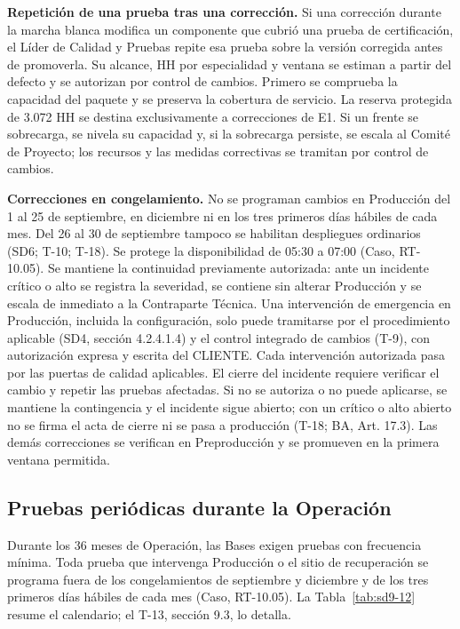 \textbf{Repetición de una prueba tras una corrección.} Si una corrección durante la marcha blanca modifica un componente que cubrió una prueba de certificación, el Líder de Calidad y Pruebas repite esa prueba sobre la versión corregida antes de promoverla. Su alcance, HH por especialidad y ventana se estiman a partir del defecto y se autorizan por control de cambios. Primero se comprueba la capacidad del paquete y se preserva la cobertura de servicio. La reserva protegida de 3.072 HH se destina exclusivamente a correcciones de E1. Si un frente se sobrecarga, se nivela su capacidad y, si la sobrecarga persiste, se escala al Comité de Proyecto; los recursos y las medidas correctivas se tramitan por control de cambios.

\textbf{Correcciones en congelamiento.} No se programan cambios en Producción del 1 al 25 de septiembre, en diciembre ni en los tres primeros días hábiles de cada mes. Del 26 al 30 de septiembre tampoco se habilitan despliegues ordinarios (SD6; T-10; T-18). Se protege la disponibilidad de 05:30 a 07:00 (Caso, RT-10.05). Se mantiene la continuidad previamente autorizada: ante un incidente crítico o alto se registra la severidad, se contiene sin alterar Producción y se escala de inmediato a la Contraparte Técnica. Una intervención de emergencia en Producción, incluida la configuración, solo puede tramitarse por el procedimiento aplicable (SD4, sección 4.2.4.1.4) y el control integrado de cambios (T-9), con autorización expresa y escrita del CLIENTE. Cada intervención autorizada pasa por las puertas de calidad aplicables. El cierre del incidente requiere verificar el cambio y repetir las pruebas afectadas. Si no se autoriza o no puede aplicarse, se mantiene la contingencia y el incidente sigue abierto; con un crítico o alto abierto no se firma el acta de cierre ni se pasa a producción (T-18; BA, Art. 17.3). Las demás correcciones se verifican en Preproducción y se promueven en la primera ventana permitida.

\subsection{Pruebas periódicas durante la Operación}

Durante los 36 meses de Operación, las Bases exigen pruebas con frecuencia mínima. Toda prueba que intervenga Producción o el sitio de recuperación se programa fuera de los congelamientos de septiembre y diciembre y de los tres primeros días hábiles de cada mes (Caso, RT-10.05). La Tabla~\ref{tab:sd9-12} resume el calendario; el T-13, sección 9.3, lo detalla.

